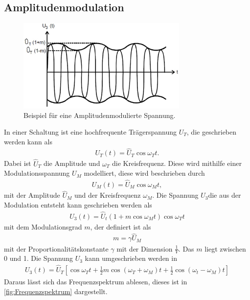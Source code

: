 \subsection{Amplitudenmodulation}
\begin{figure}[h!]
	\centering
	\includegraphics[width = 0.75\textwidth]{../Grafiken/Frequenzbaender.pdf}
	\caption{Beispiel für eine Amplitudenmodulierte Spannung.\label{fig:modulationsgrad_amplitude}\cite{V59}}
\end{figure}
In einer Schaltung ist eine hochfrequente Trägerspannung $U_T$, die geschrieben werden kann als
\begin{align}
	U_T(t)=\hat U_T\cos\omega_Tt.
\end{align}
Dabei ist $\hat U_T$ die Amplitude und $\omega_T$ die Kreisfrequenz.
Diese wird mithilfe einer Modulationsspannung $U_M$ modelliert, diese wird beschrieben durch
\begin{align}
	U_M(t)=\hat U_M\cos\omega_Mt,
\end{align}
mit der Amplitude $\hat U_M$ und der Kreisfrequenz $\omega_M$.
Die Spannung $U_3$die aus der Modulation entsteht kann geschrieben werden als
\begin{align}
	U_3(t)=\hat U_t\left(1+m\cos\omega_Mt\right)\cos \omega_Tt
\end{align}
mit dem Modulationsgrad $m$, der definiert ist als 
\begin{align}
	m = \gamma \hat U_M
\end{align}
mit der Proportionalitätskonstante $\gamma$ mit der Dimension $\frac{1}{V}$.
Das $m$ liegt zwischen 0 und 1.
Die Spannung $U_3$ kann umgeschrieben werden in
\begin{align}
	U_3(t)=\hat U_T\left[\cos\omega_Tt+\frac{1}{2}m\cos\left(\omega_T+\omega_M\right)t+\frac{1}{2}\cos\left(\omega_t-\omega_M\right)t\right]
\end{align}
Daraus lässt sich das Frequenzspektrum ablesen, dieses ist in \cref{fig:Frequenzspektrum} dargestellt.
